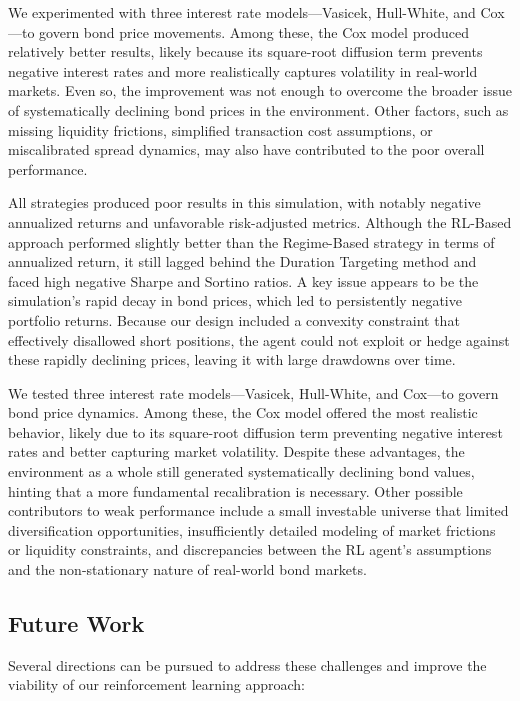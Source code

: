 \documentclass[
  a4paper,
  10pt,
  unnumberedsections,
  twoside,
]{LTJournalArticle}
\begin{document}
We experimented with three interest rate models—Vasicek, Hull-White, and Cox—to govern bond price movements. Among these, the Cox model produced relatively better results, likely because its square-root diffusion term prevents negative interest rates and more realistically captures volatility in real-world markets. Even so, the improvement was not enough to overcome the broader issue of systematically declining bond prices in the environment. Other factors, such as missing liquidity frictions, simplified transaction cost assumptions, or miscalibrated spread dynamics, may also have contributed to the poor overall performance.



All strategies produced poor results in this simulation, with notably negative annualized returns and unfavorable risk-adjusted metrics. Although the RL-Based approach performed slightly better than the Regime-Based strategy in terms of annualized return, it still lagged behind the Duration Targeting method and faced high negative Sharpe and Sortino ratios. A key issue appears to be the simulation’s rapid decay in bond prices, which led to persistently negative portfolio returns. Because our design included a convexity constraint that effectively disallowed short positions, the agent could not exploit or hedge against these rapidly declining prices, leaving it with large drawdowns over time.

We tested three interest rate models—Vasicek, Hull-White, and Cox—to govern bond price dynamics. Among these, the Cox model offered the most realistic behavior, likely due to its square-root diffusion term preventing negative interest rates and better capturing market volatility. Despite these advantages, the environment as a whole still generated systematically declining bond values, hinting that a more fundamental recalibration is necessary. Other possible contributors to weak performance include a small investable universe that limited diversification opportunities, insufficiently detailed modeling of market frictions or liquidity constraints, and discrepancies between the RL agent’s assumptions and the non-stationary nature of real-world bond markets.

\subsection{Future Work}

Several directions can be pursued to address these challenges and improve the viability of our reinforcement learning approach:
\end{document}
